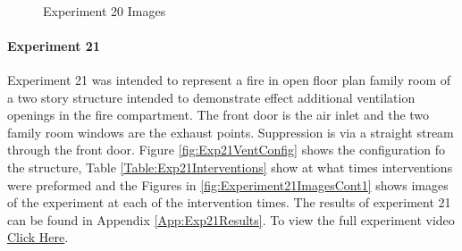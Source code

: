 \documentclass{article}
\begin{document}
\clearpage

\begin{figure}[H]
	\ContinuedFloat 
	\centering 
	 \ 
	\caption{Experiment 20 Images}
	\label{fig:Experiment20ImagesCont3} 
\end{figure}

\paragraph{Experiment 21}\mbox{}

Experiment 21 was intended to represent a fire in open floor plan family room of a two story structure intended to demonstrate effect additional ventilation openings in the fire compartment. The front door is the air inlet and the two family room windows are the exhaust points. Suppression is via a straight stream through the front door. Figure \ref{fig:Exp21VentConfig} shows the configuration fo the structure, Table \ref{Table:Exp21Interventions} show at what times interventions were preformed and the Figures in \ref{fig:Experiment21ImagesCont1} shows images of the experiment at each of the intervention times. The results of experiment 21 can be found in Appendix \ref{App:Exp21Results}. To view the full experiment video \href{https://youtu.be/ykWOmLX9Xts}{Click Here}.
\end{document}
